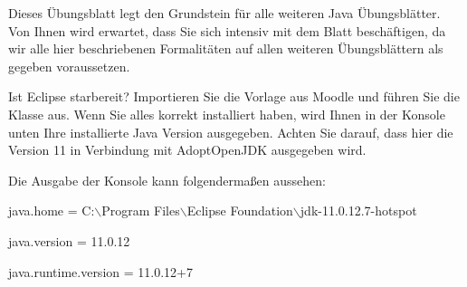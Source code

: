\documentclass{../tuda-exercise}
\begin{document}
  \maketitle

  \begin{note}[title=Information:]
    Dieses Übungsblatt legt den Grundstein für alle weiteren Java Übungsblätter. Von Ihnen wird
    erwartet, dass Sie sich intensiv mit dem Blatt beschäftigen, da wir alle hier beschriebenen
    Formalitäten auf allen weiteren Übungsblättern als gegeben voraussetzen.
  \end{note}

  \begin{task}{Ist Eclipse starbereit?}
    Importieren Sie die Vorlage  aus Moodle und führen Sie die Klasse
     aus. Wenn Sie alles korrekt installiert haben, wird Ihnen in
    der Konsole unten Ihre installierte Java Version ausgegeben. Achten Sie darauf, dass hier
    die Version 11 in Verbindung mit AdoptOpenJDK ausgegeben wird.

    Die Ausgabe der Konsole kann folgendermaßen aussehen:

    \begin{note}[color=tuda-gray]
      java.home = C:\(\backslash\)Program Files\(\backslash\)Eclipse Foundation\(\backslash\)jdk-11.0.12.7-hotspot

      java.version = 11.0.12

      java.runtime.version = 11.0.12+7
    \end{note}
  \end{task}

  \clearpage
\end{document}
